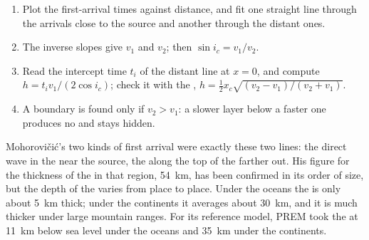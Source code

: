 \begin{method}\label{met:b1:layered-earth:moho}
\begin{enumerate}
  \item Plot the first-arrival times against distance, and fit one straight
        line through the arrivals close to the source and another through the
        distant ones.
  \item The inverse slopes give $v_1$ and $v_2$; then $\sin i_c = v_1/v_2$.
  \item Read the intercept time $t_i$ of the distant line at $x = 0$, and
        compute $h = t_i v_1/(2\cos i_c)$; check it with the , $h = \tfrac12 x_c\sqrt{(v_2 - v_1)/(v_2 + v_1)}$.
  \item A boundary is found only if $v_2 > v_1$: a slower layer below a faster
        one produces no  and stays hidden.
\end{enumerate}
\end{method}

Mohorovičić's two kinds of first arrival were exactly these two lines: the
direct wave in the  near the source, the  along the top of the
 farther out. His figure for the thickness of the  in that region,
\qty{54}{km}, has been confirmed in its order of size, but the depth of the 
varies from place to place. Under the oceans the  is only about
\qty{5}{km} thick; under the continents it averages about \qty{30}{km}, and it
is much thicker under large mountain ranges. For its reference model, PREM took
the  at \qty{11}{km} below sea level under the oceans and \qty{35}{km} under
the continents.

